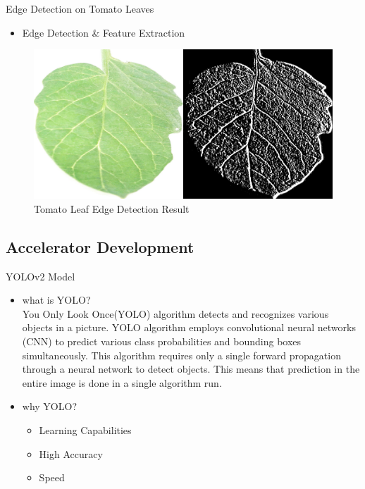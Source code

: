\documentclass[10pt, a4paper]{beamer}
\begin{document}
\begin{frame}{Edge Detection on Tomato Leaves}
	\begin{itemize}
		\item Edge Detection \& Feature Extraction
	\end{itemize}
	\begin{figure}
		\centering
		\includegraphics[scale=0.275]{leafresult}
		\caption{Tomato Leaf Edge Detection Result}
	\end{figure}
\end{frame}

\subsection{Accelerator Development}
\begin{frame}{YOLOv2 Model}
	\begin{itemize}
		\item what is YOLO?\\
		\justifying \hspace{7.5mm} You Only Look Once(YOLO) algorithm detects and recognizes various objects in a picture. YOLO algorithm employs convolutional neural networks (CNN) to predict various class probabilities and bounding boxes simultaneously. This algorithm requires only a single forward propagation through a neural network to detect objects. This means that prediction in the entire image is done in a single algorithm run.
		\item why YOLO?\\
		\begin{itemize}
			\item Learning Capabilities
			\item High Accuracy
			\item Speed
		\end{itemize}
	\end{itemize}
\end{frame}
\end{document}
